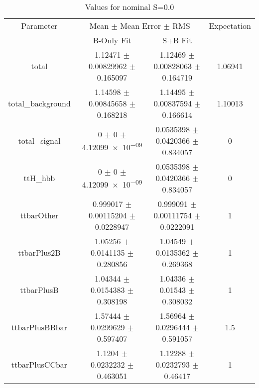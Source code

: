 \begin{table}
\centering
\caption{Values for nominal S=0.0}
\begin{tabular}{cccc}
\toprule
Parameter & \multicolumn{2}{c}{Mean $\pm$ Mean Error $\pm$ RMS} & Expectation\\
 & B-Only Fit & S+B Fit & \\
\midrule
total & \num{1.12471} $\pm$ \num{0.00829962} $\pm$ \num{0.165097} & \num{1.12469} $\pm$ \num{0.00828063} $\pm$ \num{0.164719} & \num{1.06941}\\
total\_background & \num{1.14598} $\pm$ \num{0.00845658} $\pm$ \num{0.168218} & \num{1.14495} $\pm$ \num{0.00837594} $\pm$ \num{0.166614} & \num{1.10013}\\
total\_signal & \num{0} $\pm$ \num{0} $\pm$ \num{4.12099e-09} & \num{0.0535398} $\pm$ \num{0.0420366} $\pm$ \num{0.834057} & \num{0}\\
ttH\_hbb & \num{0} $\pm$ \num{0} $\pm$ \num{4.12099e-09} & \num{0.0535398} $\pm$ \num{0.0420366} $\pm$ \num{0.834057} & \num{0}\\
ttbarOther & \num{0.999017} $\pm$ \num{0.00115204} $\pm$ \num{0.0228947} & \num{0.999091} $\pm$ \num{0.00111754} $\pm$ \num{0.0222091} & \num{1}\\
ttbarPlus2B & \num{1.05256} $\pm$ \num{0.0141135} $\pm$ \num{0.280856} & \num{1.04549} $\pm$ \num{0.0135362} $\pm$ \num{0.269368} & \num{1}\\
ttbarPlusB & \num{1.04344} $\pm$ \num{0.0154383} $\pm$ \num{0.308198} & \num{1.04336} $\pm$ \num{0.01543} $\pm$ \num{0.308032} & \num{1}\\
ttbarPlusBBbar & \num{1.57444} $\pm$ \num{0.0299629} $\pm$ \num{0.597407} & \num{1.56964} $\pm$ \num{0.0296444} $\pm$ \num{0.591057} & \num{1.5}\\
ttbarPlusCCbar & \num{1.1204} $\pm$ \num{0.0232232} $\pm$ \num{0.463051} & \num{1.12288} $\pm$ \num{0.0232793} $\pm$ \num{0.46417} & \num{1}\\
\bottomrule
\end{tabular}
\end{table}